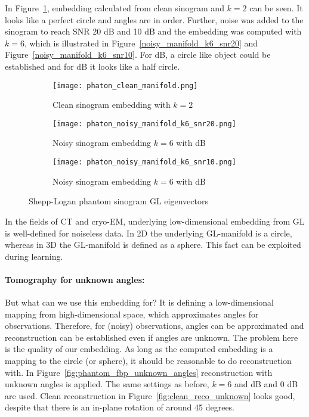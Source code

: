 In Figure~\ref{fig:clean_manifold}, embedding calculated from clean sinogram and $k=2$ can be seen.
It looks like a perfect circle and angles are in order. 
Further, noise was added to the sinogram to reach SNR 20 dB and 10 dB and the embedding was computed with $k=6$, 
which is illustrated in Figure~\ref{noisy_manifold_k6_snr20} and Figure~\ref{noisy_manifold_k6_snr10}.
For  dB, a circle like object could be established and for  dB it looks like a half circle. 

\begin{figure}[H]
    \captionsetup[subfigure]{justification=centering}
    \centering
    \begin{subfigure}[t]{0.3\textwidth}
        \texttt{[image: phaton\_clean\_manifold.png]}
        \caption{Clean sinogram embedding with $k=2$}
        \label{fig:clean_manifold}
    \end{subfigure}\hfill
    \begin{subfigure}[t]{0.3\textwidth}
      \texttt{[image: phaton\_noisy\_manifold\_k6\_snr20.png]}
      \caption{Noisy sinogram embedding $k=6$ with  dB}
      \label{fig:noisy_manifold_k6_snr20}
    \end{subfigure}\hfill
    \begin{subfigure}[t]{0.3\textwidth}
      \texttt{[image: phaton\_noisy\_manifold\_k6\_snr10.png]}
      \caption{Noisy sinogram embedding $k=6$ with  dB}
      \label{fig:noisy_manifold_k6_snr10}
    \end{subfigure}
    \caption{Shepp-Logan phantom sinogram GL eigenvectors}
    \label{fig:phantom_manifolds}
  \end{figure}

\begin{tcolorbox}[colback=red!5!white,colframe=red!75!black]
    In the fields of CT and cryo-EM, underlying low-dimensional embedding from GL is well-defined for noiseless data.
    In 2D the underlying GL-manifold is a circle, whereas in 3D the GL-manifold is defined as a sphere.
    This fact can be exploited during learning.
\end{tcolorbox}

\paragraph{Tomography for unknown angles:}
But what can we use this embedding for?
It is defining a low-dimensional mapping from high-dimensional space, which approximates angles for observations.
Therefore, for (noisy) observations, angles can be approximated and reconstruction can be established even if angles are unknown.
The problem here is the quality of our embedding. As long as the computed embedding is a mapping to the circle (or sphere),
it should be reasonable to do reconstruction with.
In Figure~\ref{fig:phantom_fbp_unknown_angles} reconstruction with unknown angles is applied. The same settings as before, $k=6$
and  dB and 0 dB are used. Clean reconstruction in Figure~\ref{fig:clean_reco_unknown} looks good, 
despite that there is an in-plane rotation of around 45 degrees. 

